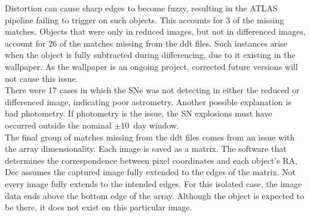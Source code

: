 Distortion can cause sharp edges to become fuzzy, resulting in the ATLAS pipeline 
failing to trigger on such objects. This accounts for 3 of the missing matches.  
Objects that were only in reduced images, but not in differenced images, account 
for 26 of the matches missing from the ddt files. Such instances arise when the 
object is fully subtracted during differencing, due to it existing in the wallpaper.  
As the wallpaper is an ongoing project, corrected future versions will not cause this issue.\\
%
%
\indent There were 17 cases in which the SNe was not detecting in either the reduced or 
differenced image, indicating poor astrometry. Another possible explanation is 
bad photometry. If photometry is the issue, the SN explosions must have occurred 
outside the nominal $\pm$10~day window.\\
%
%
\indent The final group of matches missing from the ddt files comes from an issue with 
the array dimensionality. Each image is saved as a matrix. The software that 
determines the correspondence between pixel coordinates and each object's RA, Dec 
assumes the captured image fully extended to the edges of the matrix.
Not every image fully extends to the intended edges. 
For this isolated case, the 
image data ends above the bottom edge of the array. Although the object is expected 
to be there, it does not exist on this particular image.



